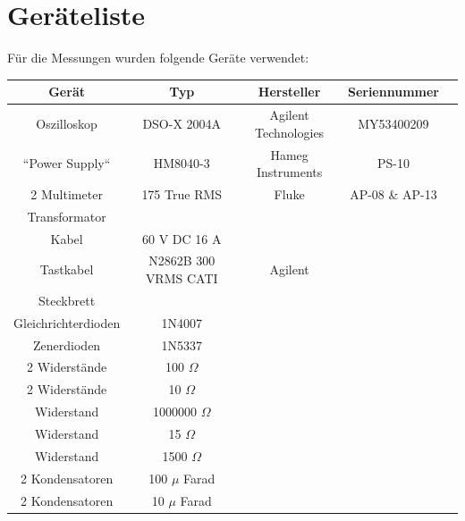 \documentclass[11pt,ngerman]{scrartcl}
\begin{document}
\section{Geräteliste}

\noindent Für die Messungen wurden folgende Geräte verwendet:

\begin{center}
	\begin{tabular}{|c|c|c|c|c|} \hline
		\textbf{Gerät}      & \textbf{Typ}         & \textbf{Hersteller}  & \textbf{Seriennummer} \\ \hline
		Oszilloskop         & DSO-X 2004A          & Agilent Technologies & MY53400209            \\ \hline
		``Power Supply``    & HM8040-3             & Hameg Instruments    & PS-10                 \\ \hline
		2 Multimeter        & 175 True RMS         & Fluke                & AP-08 \& AP-13        \\ \hline
		Transformator       &                      &                      &                       \\ \hline
		Kabel               & 60 V DC 16 A         &                      &                       \\ \hline
		Tastkabel           & N2862B 300 VRMS CATI & Agilent              &                       \\ \hline
		Steckbrett          &                      &                      &                       \\ \hline
		Gleichrichterdioden & 1N4007               &                      &                       \\ \hline
		Zenerdioden         & 1N5337               &                      &                       \\ \hline
		2 Widerstände       & 100 $\Omega$         &                      &                       \\ \hline
		2 Widerstände       & 10 $\Omega$          &                      &                       \\ \hline
		Widerstand          & 1000000 $\Omega$     &                      &                       \\ \hline
		Widerstand          & 15 $\Omega$          &                      &                       \\ \hline
		Widerstand          & 1500 $\Omega$        &                      &                       \\ \hline
		2 Kondensatoren     & 100 $\mu$ Farad      &                      &                       \\ \hline
		2 Kondensatoren     & 10 $\mu$ Farad       &                      &                       \\ \hline
	\end{tabular}
	\label{tab:material}
\end{center}
\end{document}
